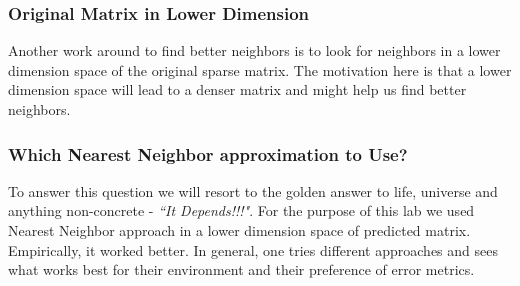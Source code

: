   \subsubsection{Original Matrix in Lower Dimension}
  Another work around to find better neighbors is to look for neighbors in a lower dimension space of the original sparse matrix. The motivation here is that a lower dimension space will lead to a denser matrix and might help us find better neighbors.
  \subsubsection{Which Nearest Neighbor approximation to Use?}
  To answer this question we will resort to the golden answer to life, universe and anything non-concrete - \textit{``It Depends!!!"}. For the purpose of this lab we used Nearest Neighbor approach in a lower dimension space of predicted matrix. Empirically, it worked better. In general, one tries different approaches and sees what works best for their environment and their preference of error metrics.
